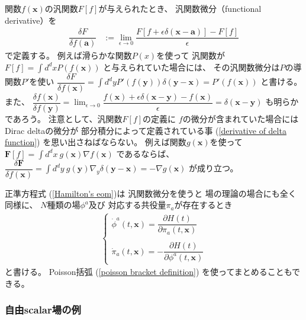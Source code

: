 関数$f(\bm{x})$の汎関数$F[f]$が与えられたとき、
汎関数微分（functional derivative）を
\begin{align}
    \dfrac{ \delta F }
        {\delta f(\bm{a})}
&:=
    \lim_{ \epsilon \to 0 }
    \dfrac{
        F[ f + \epsilon
            \delta(\bm{x} - \bm{a}) ]
    -
        F[ f ]
    }
        {\epsilon}
\end{align}
で定義する。
例えば滑らかな関数$P(x)$を使って
汎関数が
$\displaystyle
F[f] = \int d^d x P(f(\bm{x}))$
と与えられていた場合には、
その汎関数微分は$P$の導関数$P'$を使い
$\displaystyle
	\dfrac{\delta F}{\delta f(\bm{x})}
= \int d^d y
	P'( f(\bm{y}) )
	\delta(\bm{y} - \bm{x})
= P'( f(\bm{x}) )$
と書ける。
また、
$\displaystyle
\dfrac{\delta f(\bm{x})}
	{\delta f(\bm{y})}
= \lim_{\epsilon \to 0}
\dfrac{
	f(\bm{x})
	+ \epsilon \delta(\bm{x} - \bm{y})
	- f(\bm{x})
}{\epsilon}
= \delta(\bm{x} - \bm{y})$
も明らかであろう。
注意として、汎関数$F[f]$の定義に
$f$の微分が含まれていた場合には
Dirac deltaの微分が
部分積分によって定義されている事
(\ref{derivative of delta function})
を思い出さねばならない。
例えば関数$g(\bm{x})$を使って
$\displaystyle
\bm{F}[f] = \int d^d x\ 
	g(\bm{x}) \nabla f(\bm{x})$
であるならば、
$\displaystyle
\dfrac{ \delta \bm{F} }
	{\delta f(\bm{x})}
= \int d^d y\ 
g(\bm{y}) \nabla_y
	\delta(\bm{y} - \bm{x})
= - \nabla g(\bm{x})$
が成り立つ。

正準方程式
(\ref{Hamilton's eom})は
汎関数微分を使うと
場の理論の場合にも全く同様に、
$N$種類の場$\phi^a$及び
対応する共役量$\pi_a$が存在するとき
\begin{align}
\begin{cases}
	\dot{\phi}^a (t, \bm{x}) =
	\dfrac{\partial H (t)}
		{\partial \pi_a (t, \bm{x})}
\\
\\
	\dot{\pi}_a (t, \bm{x}) =
- \dfrac{\partial H (t)}
		{\partial \phi^a(t, \bm{x})}
\end{cases}
\label{hamilton eom for fields}
\end{align}
と書ける。
Poisson括弧
(\ref{poisson bracket definition})
を使ってまとめることもできる。

\subsubsection{自由scalar場の例}

